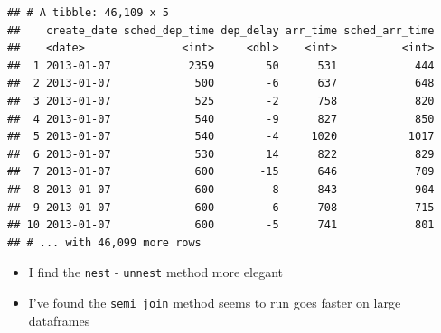 \documentclass[]{book}
\newenvironment{Shaded}{\begin{snugshade}}{\end{snugshade}}
\newcommand{\DataTypeTok}[1]{\textcolor[rgb]{0.13,0.29,0.53}{#1}}
\newcommand{\DecValTok}[1]{\textcolor[rgb]{0.00,0.00,0.81}{#1}}
\newcommand{\KeywordTok}[1]{\textcolor[rgb]{0.13,0.29,0.53}{\textbf{#1}}}
\newcommand{\NormalTok}[1]{#1}
\newcommand{\OperatorTok}[1]{\textcolor[rgb]{0.81,0.36,0.00}{\textbf{#1}}}
\newcommand{\StringTok}[1]{\textcolor[rgb]{0.31,0.60,0.02}{#1}}
\providecommand{\tightlist}{%
  \setlength{\itemsep}{0pt}\setlength{\parskip}{0pt}}
\theoremstyle{definition}
\theoremstyle{definition}
\theoremstyle{definition}
\theoremstyle{remark}
\begin{document}
\begin{Shaded}
\end{Shaded}

\begin{verbatim}
## # A tibble: 46,109 x 5
##    create_date sched_dep_time dep_delay arr_time sched_arr_time
##    <date>               <int>     <dbl>    <int>          <int>
##  1 2013-01-07            2359        50      531            444
##  2 2013-01-07             500        -6      637            648
##  3 2013-01-07             525        -2      758            820
##  4 2013-01-07             540        -9      827            850
##  5 2013-01-07             540        -4     1020           1017
##  6 2013-01-07             530        14      822            829
##  7 2013-01-07             600       -15      646            709
##  8 2013-01-07             600        -8      843            904
##  9 2013-01-07             600        -6      708            715
## 10 2013-01-07             600        -5      741            801
## # ... with 46,099 more rows
\end{verbatim}

\begin{itemize}
\tightlist
\item
  I find the \texttt{nest} - \texttt{unnest} method more elegant
\item
  I've found the \texttt{semi\_join} method seems to run goes faster on
  large dataframes
\end{itemize}
\end{document}
